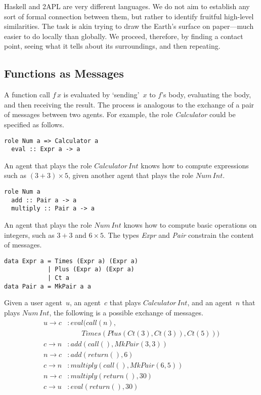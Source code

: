 \documentclass[conference,compsoc]{IEEEtran} %
\begin{document}
Haskell and 2APL are very different languages. We do not aim to establish
any sort of formal connection between them, but rather to identify fruitful
high-level similarities. The task is akin trying to draw the Earth's
surface on paper---much easier to do locally than globally. We proceed,
therefore, by finding a contact point, seeing what it tells about its
surroundings, and then repeating.

\subsection{Functions as Messages} %

A function call $f\,x$ is evaluated by `sending'~$x$ to $f$'s body,
evaluating the body, and then receiving the result. The process is
analogous to the exchange of a pair of messages between two agents. For
example, the role \textit{Calculator} could be specified as follows.
\begin{lstlisting}[style=me]
role Num a => Calculator a
  eval :: Expr a -> a
\end{lstlisting}
An agent that plays the role $\mathit{Calculator}\,\mathit{Int}$ knows
how to compute expressions such as $(3+3)\times5$, given another agent
that plays the role $\mathit{Num}\,\mathit{Int}$.
\begin{lstlisting}[style=me]
role Num a
  add :: Pair a -> a
  multiply :: Pair a -> a
\end{lstlisting}
An agent that plays the role $\mathit{Num}\,\mathit{Int}$ knows how to
compute basic operations on integers, such as $3+3$ and $6\times5$. The
types \textit{Expr} and \textit{Pair} constrain the content of messages.
\begin{lstlisting}[style=hs]
data Expr a = Times (Expr a) (Expr a) 
            | Plus (Expr a) (Expr a) 
            | Ct a
data Pair a = MkPair a a
\end{lstlisting}
Given a user agent~$u$, an agent~$c$ that plays
$\mathit{Calculator}\,\mathit{Int}$, and an agent~$n$ that plays
$\mathit{Num}\,\mathit{Int}$, the following is a possible exchange of
messages.
\begin{align*}
u\to c &: 
  \mathit{eval}(\mathit{call}(n),\\
  &\qquad\mathit{Times}(
    \mathit{Plus}(\mathit{Ct}(3),\mathit{Ct}(3)),\mathit{Ct}(5)))\\
c\to n &: \mathit{add}(\mathit{call}(), \mathit{MkPair}(3, 3))\\
n\to c &: \mathit{add}(\mathit{return}(), 6)\\
c\to n &: \mathit{multiply}(\mathit{call}(), \mathit{MkPair}(6, 5))\\
n\to c &: \mathit{multiply}(\mathit{return}(), 30)\\
c\to u &: \mathit{eval}(\mathit{return}(), 30)
\end{align*}
\end{document}
